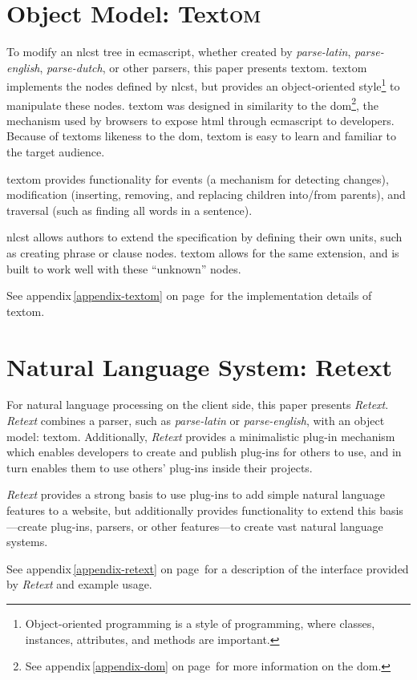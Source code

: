 \section{Object Model: Text\textsc{om}}\label{object-model}

To modify an \gls{nlcst} tree in \gls{ecmascript}, whether created by
  \emph{parse-latin}, \emph{parse-english}, \emph{parse-dutch}, or other
  parsers, this paper presents \gls{textom}.
\gls{textom} implements the nodes defined by \gls{nlcst},
  but provides an object-oriented style\footnote{Object-oriented
    programming is a style of programming, where classes, instances,
    attributes, and methods are important.} to manipulate these nodes.
\gls{textom} was designed in similarity to the \gls{dom}\footnote{See
    appendix\,\ref{appendix-dom} on page\,\pageref{appendix-dom} for more
    information on the \gls{dom}.},
  the mechanism used by browsers to expose \gls{html} through
  \gls{ecmascript} to developers.
Because of \glspl{textom} likeness to the \gls{dom}, \gls{textom} is
  easy to learn and familiar to the target audience.

\gls{textom} provides functionality for events (a mechanism for detecting
  changes), modification (inserting, removing, and replacing children
  into\slash from parents), and traversal (such as finding all words in a
  sentence).

\gls{nlcst} allows authors to extend the specification by defining their
  own units, such as creating phrase or clause nodes.
\gls{textom} allows for the same extension, and is built to work well
  with these ``unknown'' nodes.

\medskip \noindent See appendix\,\ref{appendix-textom} on
  page\,\pageref{appendix-textom} for the implementation details of
  \gls{textom}.

\section{Natural Language System:
  Retext}\label{natural-language-system-retext}

For natural language processing on the client side, this paper presents
  \emph{Retext}.
\emph{Retext} combines a parser, such as \emph{parse-latin} or
  \emph{parse-english}, with an object model: \gls{textom}.
Additionally, \emph{Retext} provides a minimalistic plug-in mechanism which
  enables developers to create and publish plug-ins for others to use, and in
  turn enables them to use others' plug-ins inside their projects.

\emph{Retext} provides a strong basis to use plug-ins to add simple natural
  language features to a website, but additionally provides functionality to
  extend this basis---create plug-ins, parsers, or other features---to
  create vast natural language systems.

\medskip \noindent See appendix\,\ref{appendix-retext} on
  page\,\pageref{appendix-retext} for a description of the interface
  provided by \emph{Retext} and example usage.
